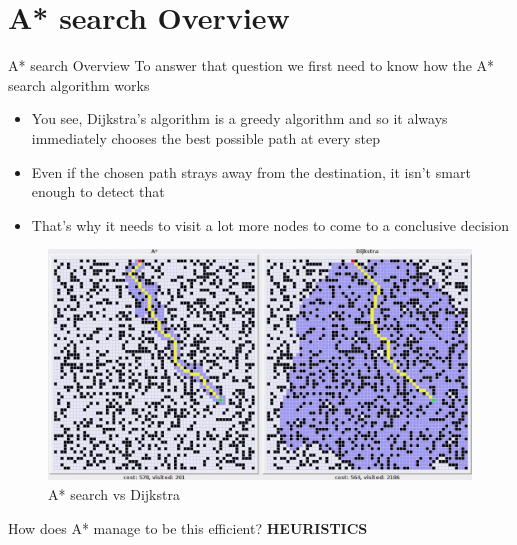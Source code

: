 \documentclass[14pt]{beamer}
\begin{document}
\section{A* search Overview}
\begin{frame}{A* search Overview}
	To answer that question we first need to know how the A* search algorithm works
	\begin{itemize}
		\item<1-> You see, Dijkstra's algorithm is a greedy algorithm and so it always immediately chooses the best possible path at every step 
		\item<2-> Even if the chosen path strays away from the destination, it isn't smart enough to detect that 
		\item<3-> That's why it needs to visit a lot more nodes to come to a conclusive decision
	\end{itemize}
\end{frame}
\begin{frame}
	\begin{figure}[h]
	\centering
		\includegraphics[scale=0.4]{avsdijkstra.jpg}
		\caption{A* search vs Dijkstra}
		\label{pic:avsdijkstra}
	\end{figure}
\end{frame}

\begin{frame}
	\begin{block}{\centering How does A* manage to be this efficient?}
		\centering
		\large \textbf {HEURISTICS}
	\end{block}
\end{frame}
\end{document}
